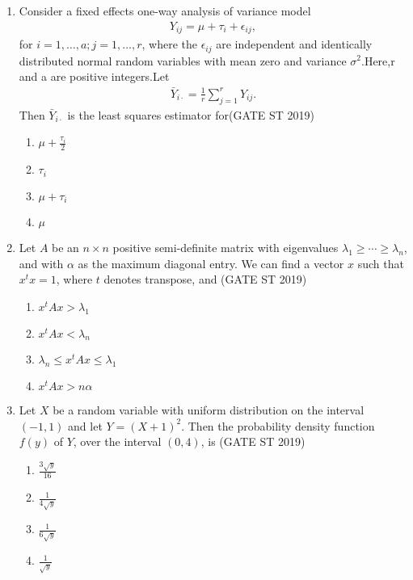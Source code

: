 \documentclass[journal]{IEEEtran}
\begin{document}
\begin{enumerate}[start=1]
\item Consider a fixed effects one-way analysis of variance model
\begin{align*}
Y_{ij} = \mu + \tau_i + \epsilon_{ij},
\end{align*}
for \(i=1,\ldots,a; j=1,\ldots,r\), where the \(\epsilon_{ij}\) are independent and identically distributed normal random variables with mean zero and variance \(\sigma^2\).Here,r and a are positive integers.Let
\begin{align*}
\bar{Y}_{i \cdot} = \frac{1}{r} \sum_{j=1}^r Y_{ij}.
\end{align*}
Then \(\bar{Y}_{i \cdot}\) is the least squares estimator for\hfill(GATE ST 2019)
\begin{multicols}{4}
\begin{enumerate}
\item \(\mu +\frac{\tau_i}{2}\)
\item \(\tau_i\)
\item \(\mu + \tau_i\)
\item \(\mu\)
\end{enumerate}
\end{multicols}


\item Let \(A\) be an \(n \times n\) positive semi-definite matrix with eigenvalues \(\lambda_1 \geq \cdots \geq \lambda_n\), and with \(\alpha\) as the maximum diagonal entry. We can find a vector \(x\) such that \(x^t x = 1\), where \(t\) denotes transpose, and \hfill(GATE ST 2019)
\begin{enumerate}
\item \(x^t A x > \lambda_1\)
\item \(x^t A x < \lambda_n\)
\item \(\lambda_n \leq x^t A x \leq \lambda_1\)
\item \(x^t A x > n \alpha\)
\end{enumerate}

\item Let \(X\) be a random variable with uniform distribution on the interval \((-1,1)\) and let \(Y = (X+1)^2\). Then the probability density function \(f(y)\) of \(Y\), over the interval \((0,4)\), is \hfill(GATE ST 2019)
\begin{multicols}{4}
\begin{enumerate}
\item \(\frac{3\sqrt{y}}{16}\)
\item \(\frac{1}{4\sqrt{y}}\)
\item \(\frac{1}{6\sqrt{y}}\)
\item \(\frac{1}{\sqrt{y}}\)
\end{enumerate}
\end{multicols}


\end{enumerate}
\end{document}

